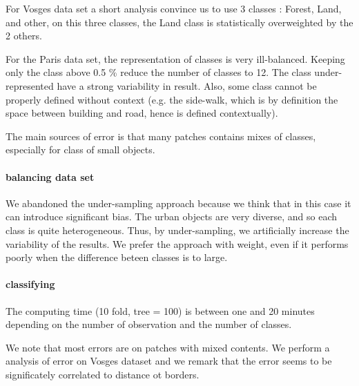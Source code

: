 				For Vosges data set a short analysis convince us to use 3 classes : Forest, Land, and other, on this three classes, the Land class is statistically overweighted by the 2 others.	
			
				For the Paris data set, the representation of classes is very ill-balanced.
				Keeping only the class above 0.5 \% reduce the number of classes to 12.
				The class under-represented have a strong variability in result.
				Also, some class cannot be properly defined without context (e.g. the side-walk, which is by definition the space between building and road, hence is defined contextually).
		 	
			The main sources of error is that many patches contains mixes of classes, especially for class of small objects. 
			\paragraph{balancing data set}
				 We abandoned the under-sampling approach because we think that in this case it can introduce significant bias.
				 The urban objects are very diverse, and so each class is quite heterogeneous. Thus, by under-sampling, we artificially increase the variability of the results.
				 We prefer the approach with weight, even if it performs poorly when the difference beteen classes is to large.
				
			\paragraph{classifying}
				
				The computing time (10 fold, tree = 100) is between one and 20 minutes depending on the number of observation and the number of classes.
				
				We note that most errors are on patches with mixed contents.
				We perform a analysis of error on Vosges dataset and we remark that the error seems to be significately correlated to distance ot borders.
				
				
				
								
				 
				 
		
 